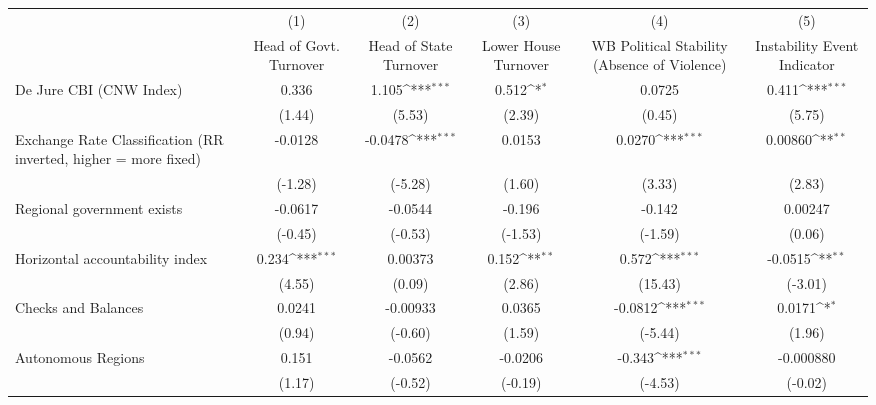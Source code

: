 {
\def\sym#1{\ifmmode^{#1}\else\(^{#1}\)\fi}
\begin{tabular*}{\linewidth}{@{\hskip\tabcolsep\extracolsep\fill}l*{5}{c}}
\hline\hline
                &\multicolumn{1}{c}{(1)}&\multicolumn{1}{c}{(2)}&\multicolumn{1}{c}{(3)}&\multicolumn{1}{c}{(4)}&\multicolumn{1}{c}{(5)}\\
                &\multicolumn{1}{c}{Head of Govt. Turnover}&\multicolumn{1}{c}{Head of State Turnover}&\multicolumn{1}{c}{Lower House Turnover}&\multicolumn{1}{c}{WB Political Stability (Absence of Violence)}&\multicolumn{1}{c}{Instability Event Indicator}\\
\hline
De Jure CBI (CNW Index)&    0.336         &    1.105\sym{***}&    0.512\sym{*}  &   0.0725         &    0.411\sym{***}\\
                &   (1.44)         &   (5.53)         &   (2.39)         &   (0.45)         &   (5.75)         \\
[1em]
Exchange Rate Classification (RR inverted, higher = more fixed)&  -0.0128         &  -0.0478\sym{***}&   0.0153         &   0.0270\sym{***}&  0.00860\sym{**} \\
                &  (-1.28)         &  (-5.28)         &   (1.60)         &   (3.33)         &   (2.83)         \\
[1em]
Regional government exists   &  -0.0617         &  -0.0544         &   -0.196         &   -0.142         &  0.00247         \\
                &  (-0.45)         &  (-0.53)         &  (-1.53)         &  (-1.59)         &   (0.06)         \\
[1em]
Horizontal accountability index&    0.234\sym{***}&  0.00373         &    0.152\sym{**} &    0.572\sym{***}&  -0.0515\sym{**} \\
                &   (4.55)         &   (0.09)         &   (2.86)         &  (15.43)         &  (-3.01)         \\
[1em]
Checks and Balances&   0.0241         & -0.00933         &   0.0365         &  -0.0812\sym{***}&   0.0171\sym{*}  \\
                &   (0.94)         &  (-0.60)         &   (1.59)         &  (-5.44)         &   (1.96)         \\
[1em]
Autonomous Regions&    0.151         &  -0.0562         &  -0.0206         &   -0.343\sym{***}&-0.000880         \\
                &   (1.17)         &  (-0.52)         &  (-0.19)         &  (-4.53)         &  (-0.02)         \\

\end{tabular*}}
